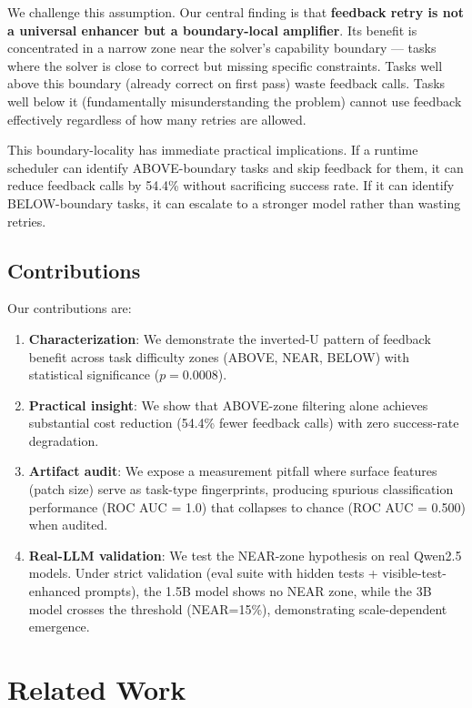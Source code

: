 \documentclass[11pt,a4paper]{article}
\begin{document}
We challenge this assumption. Our central finding is that \textbf{feedback retry is not a universal enhancer but a boundary-local amplifier}. Its benefit is concentrated in a narrow zone near the solver's capability boundary --- tasks where the solver is close to correct but missing specific constraints. Tasks well above this boundary (already correct on first pass) waste feedback calls. Tasks well below it (fundamentally misunderstanding the problem) cannot use feedback effectively regardless of how many retries are allowed.

This boundary-locality has immediate practical implications. If a runtime scheduler can identify ABOVE-boundary tasks and skip feedback for them, it can reduce feedback calls by 54.4\% without sacrificing success rate. If it can identify BELOW-boundary tasks, it can escalate to a stronger model rather than wasting retries.

\subsection{Contributions}

Our contributions are:

\begin{enumerate}
    \item \textbf{Characterization}: We demonstrate the inverted-U pattern of feedback benefit across task difficulty zones (ABOVE, NEAR, BELOW) with statistical significance ($p = 0.0008$).
    \item \textbf{Practical insight}: We show that ABOVE-zone filtering alone achieves substantial cost reduction (54.4\% fewer feedback calls) with zero success-rate degradation.
    \item \textbf{Artifact audit}: We expose a measurement pitfall where surface features (patch size) serve as task-type fingerprints, producing spurious classification performance (ROC AUC = 1.0) that collapses to chance (ROC AUC = 0.500) when audited.
    \item \textbf{Real-LLM validation}: We test the NEAR-zone hypothesis on real Qwen2.5 models. Under strict validation (eval suite with hidden tests + visible-test-enhanced prompts), the 1.5B model shows no NEAR zone, while the 3B model crosses the threshold (NEAR=15\%), demonstrating scale-dependent emergence.
\end{enumerate}

\section{Related Work}
\end{document}

